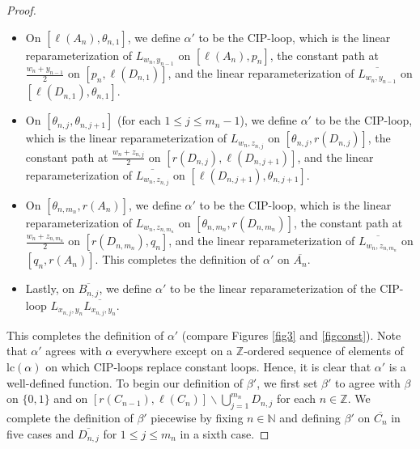 \documentclass[10pt,a4paper]{amsart}
\newcommand{\bbn}{\mathbb{N}}
\newcommand{\bbz}{\mathbb{Z}}
\newcommand{\lc}{\text{lc}}
\newcommand{\ov}{\overline}
\begin{document}
\begin{proof}
\begin{itemize}
    \item[$\bf (A1)$]\label{alpha'1} On $[\ell(A_{n}),\theta_{n,1}]$, we define $\alpha'$ to be the CIP-loop, which is the linear reparameterization of $L_{w_n,y_{n-1}}$ on $[\ell(A_{n}),p_n]$, the constant path at $\frac{w_n+y_{n-1}}{2}$ on $[p_n,\ell(D_{n,1})]$, and the linear reparameterization of $\ov{L_{w_n,y_{n-1}}}$ on $[\ell(D_{n,1}),\theta_{n,1}]$.
\vspace{.75em}
    \item[$\bf (A2)$]\label{alpha'2} On $[\theta_{n,j},\theta_{n,j+1}]$ (for each $1\leq j\leq m_{n}-1$), we define $\alpha '$ to be the CIP-loop, which is the linear reparameterization of $L_{w_n,z_{n,j}}$ on $[\theta_{n,j},r(D_{n,j})]$, the constant path at $\frac{w_n+z_{n,j}}{2}$ on $[r(D_{n,j}),\ell(D_{n,j+1})]$, and the linear reparameterization of $\ov{L_{w_n,z_{n,j}}}$ on $[\ell(D_{n,j+1}),\theta_{n,j+1}]$.
\vspace{.75em}
    \item[$\bf (A3)$]\label{alpha'3} On $[\theta_{n,m_n},r(A_n)]$, we define $\alpha '$ to be the CIP-loop, which is the linear reparameterization of $L_{w_n, z_{n,m_n}}$ on $[\theta_{n,m_n},r(D_{n,m_n})]$, the constant path at $\frac{w_n+ z_{n,m_n}}{2}$ on $[r(D_{n,m_n}),q_n]$, and the linear reparameterization of $\ov{L_{w_n, z_{n,m_n}}}$ on $[q_n,r(A_n)]$. This completes the definition of $\alpha '$ on $\ov{A_n}$.
\vspace{.75em}
    \item[$\bf (A4)$]\label{alpha'4} Lastly, on $\ov{B_{n,j}}$, we define $\alpha '$ to be the linear reparameterization of the CIP-loop $L_{x_{n,j},y_{n}}\ov{L_{x_{n,j},y_{n}}}$.
\end{itemize}

This completes the definition of $\alpha '$ (compare Figures \ref{fig3} and \ref{figconst}). Note that $\alpha'$ agrees with $\alpha$ everywhere except on a $\bbz$-ordered sequence of elements of $\lc(\alpha)$ on which CIP-loops replace constant loops. Hence, it is clear that $\alpha'$ is a well-defined function.
To begin our definition of $\beta'$, we first set $\beta'$ to agree with $\beta$ on $\{0,1\}$ and on $[r(C_{n-1}),\ell(C_n)]\backslash \bigcup_{j=1}^{m_n}D_{n,j}$ for each $n\in\bbz$. We complete the definition of $\beta' $ piecewise by fixing $n\in\bbn$ and defining $\beta'$ on $\ov{C_n}$ in five cases and $\ov{D_{n,j}}$ for $1\leq j\leq m_n$ in a sixth case.


\end{proof}
\end{document}
